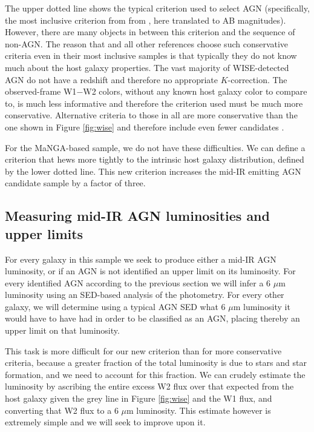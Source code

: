 \documentclass[12pt, preprint]{hacked-aastex}
\begin{document}
The upper dotted line shows the typical criterion used 
to select AGN  (specifically, the most inclusive criterion from from 
\cite{assef18a}, here translated to AB magnitudes). However, there are 
many objects in between this criterion
and the sequence of non-AGN. The reason that \cite{assef18a} and all other
references choose such conservative criteria even in their most inclusive
samples is that typically they do  not know much about the host galaxy properties. 
The vast majority of WISE-detected AGN do not have a redshift and therefore 
no appropriate $K$-correction. The observed-frame W1$-$W2 colors, without
any known host galaxy color to compare to, is much less informative and therefore
the criterion used must be much more conservative. Alternative  criteria to 
those in \cite{assef18a} all are more conservative than the one shown in 
Figure \ref{fig:wise} and therefore include even fewer  candidates 
\cite{jarrett11a,stern12a}.

For the MaNGA-based sample, we do not have these difficulties. We can 
define a criterion that hews more tightly to the intrinsic host galaxy 
distribution, defined by the lower dotted line. This new criterion
increases the mid-IR emitting AGN candidate sample by a factor of three.

\subsection{Measuring mid-IR AGN luminosities and upper limits}

For every galaxy in this sample we seek to produce either a mid-IR AGN
luminosity, or if an AGN is not identified an upper limit on its luminosity. 
For every identified AGN according to the previous 
section we will infer a 6 $\mu$m luminosity using an SED-based analysis
of the photometry. 
For every other galaxy, we will determine using a typical AGN SED what 
6 $\mu$m luminosity it would have to have had in order to be classified
as an AGN, placing thereby an upper limit on that luminosity.

This task is more difficult for our new criterion than for more
conservative criteria, because a greater fraction of the total
luminosity is due to stars and star formation,
and we need to account for this fraction. We can crudely estimate the 
luminosity by ascribing the entire excess W2 flux over that expected 
from the host galaxy given the grey line in Figure \ref{fig:wise} and 
the W1 flux, and converting that W2 flux to a 6 $\mu$m luminosity. This
estimate however is extremely simple and we will seek to improve
upon it.
\end{document}
